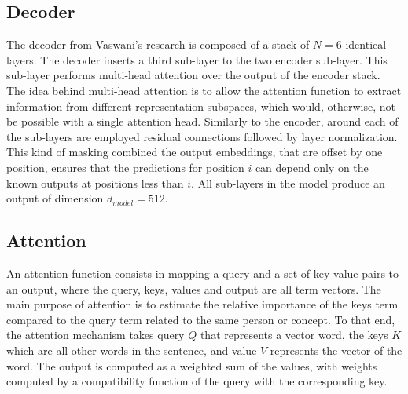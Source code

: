 \documentclass[\main/main.tex]{subfiles}
\begin{document}
\subsection{Decoder}
The decoder from Vaswani's research \cite{vaswani2017attention} is composed of a stack of $N=6$ identical layers. The decoder inserts a third sub-layer to the two encoder sub-layer. This sub-layer performs multi-head attention over the output of the encoder stack. The idea behind multi-head attention is to allow the attention function to extract information from different representation subspaces, which would, otherwise, not be possible with a single attention head. Similarly to the encoder, around each of the sub-layers are employed residual connections followed by layer normalization. This kind of masking combined the output embeddings, that are offset by one position, ensures that the predictions for position $i$ can depend only on the known outputs at positions less than $i$. All sub-layers in the model produce an output of dimension $d_{model} = 512$.

\subsection{Attention}
An attention function consists in mapping a query and a set of key-value pairs to an output, where the query, keys, values and output are all term vectors. The main purpose of attention is to estimate the relative importance of the keys term compared to the query term related to the same person or concept. To that end, the attention mechanism takes query $Q$ that represents a vector word, the keys $K$ which are all other words in the sentence, and value $V$ represents the vector of the word. The output is computed as a weighted sum of the values, with weights computed by a compatibility function of the query with the corresponding key.
\end{document}
